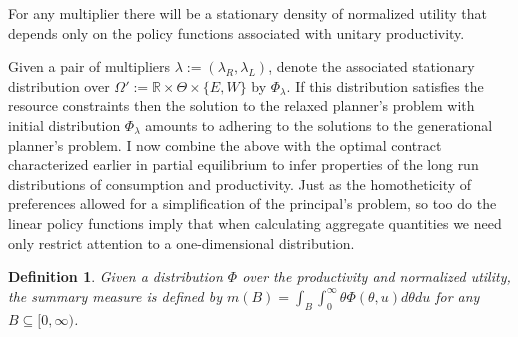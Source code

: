 \documentclass[11pt]{article}
\theoremstyle{plain}
\newtheorem{defn}{Definition}[section]
\begin{document}
For any multiplier there will be a stationary density of normalized utility that depends only on the policy functions associated with unitary productivity. 
\fi

Given a pair of multipliers $\lambda := (\lambda_R, \lambda_L)$, denote the associated stationary distribution over $\Omega' := \mathbb{R} \times \Theta \times \{E,W\}$ by $\Phi_{\lambda}$. If this distribution satisfies the resource constraints then the solution to the relaxed planner's problem with initial distribution $\Phi_{\lambda}$ amounts to adhering to the solutions to the generational planner's problem. I now combine the above with the optimal contract characterized earlier in partial equilibrium to infer properties of the long run distributions of consumption and productivity. Just as the homotheticity of preferences allowed for a simplification of the principal's problem, so too do the linear policy functions imply that when calculating aggregate quantities we need only restrict attention to a one-dimensional distribution.

\begin{defn}\label{summary_m}
Given a distribution $\Phi$ over the productivity and normalized utility, the summary measure is defined by $m(B) = \int_{B}\int_{0}^{\infty} \theta\Phi(\theta,u) d\theta du$ for any $B \subseteq [0, \infty)$.
\end{defn} 
\end{document}
